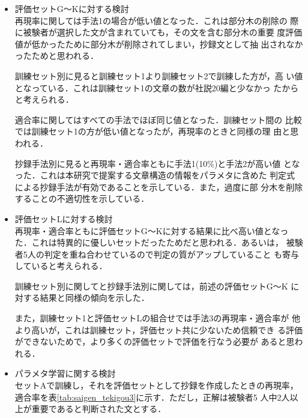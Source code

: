 \begin{itemize}
 \item 評価セットG〜Kに対する検討 \\
       再現率に関しては手法1の場合が低い値となった．これは部分木の削除の
       際に被験者が選択した文が含まれていても，その文を含む部分木の重要
       度評価値が低かったために部分木が削除されてしまい，抄録文として抽
       出されなかったためと思われる．

       訓練セット別に見ると訓練セット1より訓練セット2で訓練した方が，高
       い値となっている．これは訓練セット1の文章の数が社説20編と少なかっ
       たからと考えられる．

       適合率に関してはすべての手法でほぼ同じ値となった．訓練セット間の
       比較では訓練セット1の方が低い値となったが，再現率のときと同様の理
       由と思われる．

       抄録手法別に見ると再現率・適合率ともに手法1(10\%)と手法2が高い値
       となった．これは本研究で提案する文章構造の情報をパラメタに含めた
       判定式による抄録手法が有効であることを示している．また，過度に部
       分木を削除することの不適切性を示している．

 \item 評価セットLに対する検討 \\
       再現率・適合率ともに評価セットG〜Kに対する結果に比べ高い値となっ
       た．これは特異的に優しいセットだったためだと思われる．あるいは，
       被験者5人の判定を重ね合わせているので判定の質がアップしていること
       も寄与していると考えられる．

       訓練セット別に関してと抄録手法別に関しては，前述の評価セットG〜K 
       に対する結果と同様の傾向を示した．

       また，訓練セット1と評価セットLの組合せでは手法3の再現率・適合率が
       他より高いが，これは訓練セット，評価セット共に少ないため信頼でき
       る評価ができないためで，より多くの評価セットで評価を行なう必要が
       あると思われる．

 \item パラメタ学習に関する検討\\
       セットAで訓練し，それを評価セットとして抄録を作成したときの再現率，
       適合率を表\ref{tab:saigen_tekigou3}に示す．ただし，正解は被験者5
       人中2人以上が重要であると判断された文とする．


\end{itemize}
